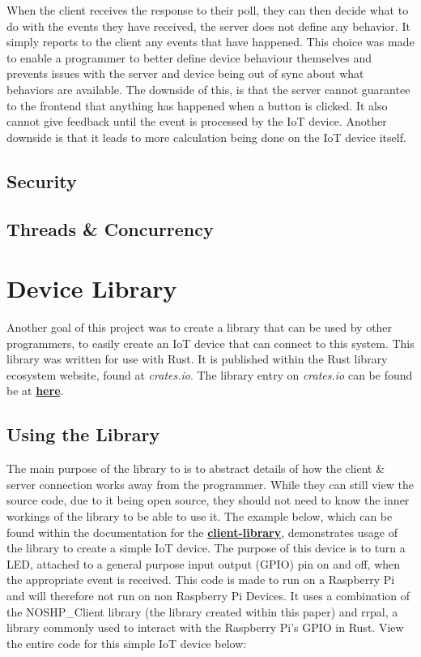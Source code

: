 When the client receives the response to their poll, they can then decide what to do with the events they have received, the server does not define any behavior. It simply reports to the client any events that have happened. This choice was made to enable a programmer to better define device behaviour themselves and prevents issues with the server and device being out of sync about what behaviors are available. The downside of this, is that the server cannot guarantee to the frontend that anything has happened when a button is clicked. It also cannot give feedback until the event is processed by the IoT device. Another downside is that it leads to more calculation being done on the IoT device itself.

\subsection{Security} \label{sec:chap3:server:security}

\subsection{Threads \& Concurrency} \label{sec:chap3:server:threads}


\section{Device Library} \label{sec:chap3:devicelib}
Another goal of this project was to create a library that can be used by other programmers, to easily create an IoT device that can connect to this system. This library was written for use with Rust. It is published within the Rust library ecosystem website, found at \textit{crates.io}. The library entry on \textit{crates.io} can be found be at \textbf{\href{https://crates.io/crates/NOSHP-Client}{here}}. 

\subsection{Using the Library}
The main purpose of the library to is to abstract details of how the client \& server connection works away from the programmer. While they can still view the source code, due to it being open source, they should not need to know the inner workings of the library to be able to use it. The example below, which can be found within the documentation for the \textbf{\href{https://docs.rs/NOSHP-Client/0.1.9/NOSHP_Client/}{client-library}}, demonstrates usage of the library to create a simple IoT device. The purpose of this device is to turn a LED, attached to a general purpose input output (GPIO) pin on and off, when the appropriate event is received. This code is made to run on a Raspberry Pi and will therefore not run on non Raspberry Pi Devices. It uses a combination of the NOSHP\_Client library (the library created within this paper) and rrpal, a library commonly used to interact with the Raspberry Pi's GPIO in Rust. View the entire code for this simple IoT device below: 

